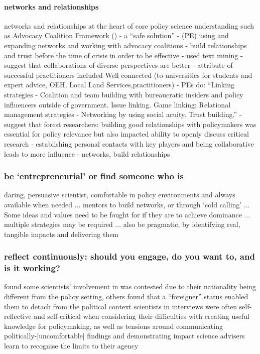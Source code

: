 \paragraph{networks and relationships}
networks and relationships at the heart of core policy science understanding such as Advocacy Coalition Framework (\cite{Dowding2018})
\cite{CairneyO2020} - a ``safe solution''
\cite{Mintrom2019} - (PE) using and expanding networks and working with advocacy coalitions
\cite{BollykyP2024} - build relationships and trust before the time of crisis in order to be effective
\cite{ArnoldNG2016} - used text mining
\cite{BoswellS2017} - suggest that collaborations of diverse perspectives are better  
\cite{GogginEtAl2015} - attribute of successful practitioners included Well connected (to universities for students and expert advice, OEH, Local Land Services,practitioners)
\cite{vonMalmborg2024strategies} - PEs do: ``Linking strategies - Coalition and team building with bureaucratic insiders and policy influencers outside of government. Issue linking. Game linking; Relational management strategies - Networking by using social acuity. Trust building.''
\cite{OjanenBKP2021} - suggest that forest researchers: building good relationships with policymakers was essential for policy relevance but also impacted ability to openly discuss critical research
\cite{SaxonbergSL2023} - establishing personal contacts with key players and being collaborative leads to more influence
\cite{ThompsonD2024} - networks, build relationships
\subsubsection{be `entrepreneurial' or find someone who is}
daring, persuasive scientist, comfortable in policy environments and always available when needed ... mentors to build networks, or through `cold calling' ... Some ideas and values need to be fought for if they are to achieve dominance ... multiple strategies may be required ... also be pragmatic, by identifying real, tangible impacts and delivering them

\subsubsection{reflect continuously: should you engage, do you want to, and is it working?}
\cite{OjanenBKP2021} found some scientists' involvement in \SPI{} was contested due to their nationality being different from the policy setting, others found that a ``foreigner'' status enabled them to detach from the political context 
\cite{OjanenBKP2021} scientists in interviews were often self-reflective and self-critical when considering their difficulties with creating useful knowledge for policymaking, as well as tensions around communicating politically-[uncomfortable] findings and demonstrating impact
\cite{Obermeister2022} science advisers learn to recognise the limits to their agency

